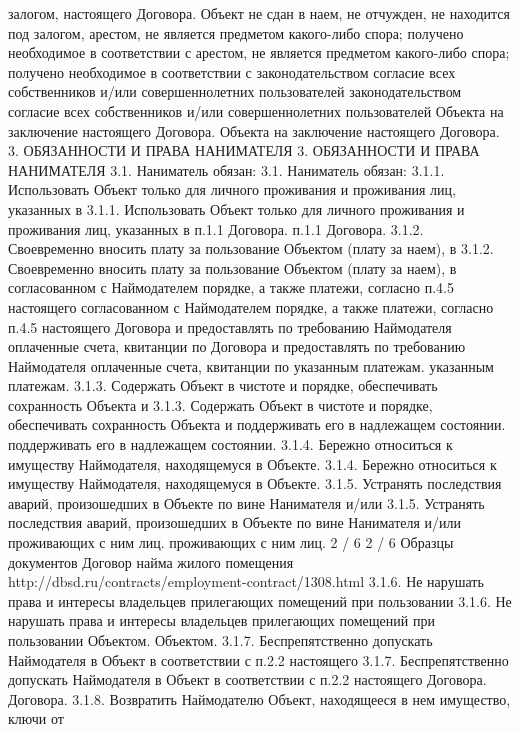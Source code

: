 залогом,
настоящего Договора. Объект не сдан в наем, не отчужден, не находится под
залогом,
арестом, не является предметом какого-либо спора; получено необходимое в
соответствии с
арестом, не является предметом какого-либо спора; получено необходимое в
соответствии с
законодательством согласие всех собственников и/или совершеннолетних
пользователей
законодательством согласие всех собственников и/или совершеннолетних
пользователей
Объекта на заключение настоящего Договора.
Объекта на заключение настоящего Договора.
3. ОБЯЗАННОСТИ И ПРАВА НАНИМАТЕЛЯ
3. ОБЯЗАННОСТИ И ПРАВА НАНИМАТЕЛЯ
3.1. Наниматель обязан:
3.1. Наниматель обязан:
3.1.1. Использовать Объект только для личного проживания и проживания лиц,
указанных в
3.1.1. Использовать Объект только для личного проживания и проживания лиц,
указанных в
п.1.1 Договора.
п.1.1 Договора.
3.1.2. Своевременно вносить плату за пользование Объектом (плату за наем), в
3.1.2. Своевременно вносить плату за пользование Объектом (плату за наем), в
согласованном с Наймодателем порядке, а также платежи, согласно п.4.5 настоящего
согласованном с Наймодателем порядке, а также платежи, согласно п.4.5 настоящего
Договора и предоставлять по требованию Наймодателя оплаченные счета, квитанции
по
Договора и предоставлять по требованию Наймодателя оплаченные счета, квитанции
по
указанным платежам.
указанным платежам.
3.1.3. Содержать Объект в чистоте и порядке, обеспечивать сохранность Объекта и
3.1.3. Содержать Объект в чистоте и порядке, обеспечивать сохранность Объекта и
поддерживать его в надлежащем состоянии.
поддерживать его в надлежащем состоянии.
3.1.4. Бережно относиться к имуществу Наймодателя, находящемуся в Объекте.
3.1.4. Бережно относиться к имуществу Наймодателя, находящемуся в Объекте.
3.1.5. Устранять последствия аварий, произошедших в Объекте по вине Нанимателя
и/или
3.1.5. Устранять последствия аварий, произошедших в Объекте по вине Нанимателя
и/или
проживающих с ним лиц.
проживающих с ним лиц.
                                                2 / 6
                                                2 / 6
Образцы документов
Договор найма жилого помещения
http://dbsd.ru/contracts/employment-contract/1308.html
3.1.6. Не нарушать права и интересы владельцев прилегающих помещений при
пользовании
3.1.6. Не нарушать права и интересы владельцев прилегающих помещений при
пользовании
Объектом.
Объектом.
3.1.7. Беспрепятственно допускать Наймодателя в Объект в соответствии с п.2.2
настоящего
3.1.7. Беспрепятственно допускать Наймодателя в Объект в соответствии с п.2.2
настоящего
Договора.
Договора.
3.1.8. Возвратить Наймодателю Объект, находящееся в нем имущество, ключи от
